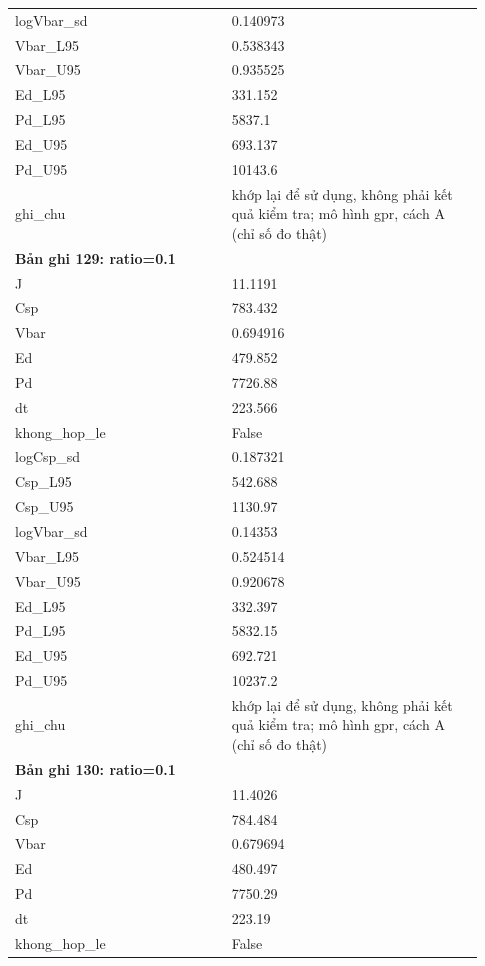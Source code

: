\begin{longtable}{p{0.43\linewidth}p{0.50\linewidth}}
logVbar\_\allowbreak sd & 0.140973 \\
Vbar\_\allowbreak L95 & 0.538343 \\
Vbar\_\allowbreak U95 & 0.935525 \\
Ed\_\allowbreak L95 & 331.152 \\
Pd\_\allowbreak L95 & 5837.1 \\
Ed\_\allowbreak U95 & 693.137 \\
Pd\_\allowbreak U95 & 10143.6 \\
ghi\_\allowbreak chu & khớp lại để sử dụng, không phải kết quả kiểm tra; mô hình gpr, cách A (chỉ số đo thật) \\
\midrule
\multicolumn{2}{p{0.95\linewidth}}{\textbf{Bản ghi 129: ratio=0.1}} \\
J & 11.1191 \\
Csp & 783.432 \\
Vbar & 0.694916 \\
Ed & 479.852 \\
Pd & 7726.88 \\
dt & 223.566 \\
khong\_\allowbreak hop\_\allowbreak le & False \\
logCsp\_\allowbreak sd & 0.187321 \\
Csp\_\allowbreak L95 & 542.688 \\
Csp\_\allowbreak U95 & 1130.97 \\
logVbar\_\allowbreak sd & 0.14353 \\
Vbar\_\allowbreak L95 & 0.524514 \\
Vbar\_\allowbreak U95 & 0.920678 \\
Ed\_\allowbreak L95 & 332.397 \\
Pd\_\allowbreak L95 & 5832.15 \\
Ed\_\allowbreak U95 & 692.721 \\
Pd\_\allowbreak U95 & 10237.2 \\
ghi\_\allowbreak chu & khớp lại để sử dụng, không phải kết quả kiểm tra; mô hình gpr, cách A (chỉ số đo thật) \\
\midrule
\multicolumn{2}{p{0.95\linewidth}}{\textbf{Bản ghi 130: ratio=0.1}} \\
J & 11.4026 \\
Csp & 784.484 \\
Vbar & 0.679694 \\
Ed & 480.497 \\
Pd & 7750.29 \\
dt & 223.19 \\
khong\_\allowbreak hop\_\allowbreak le & False \\

\end{longtable}
